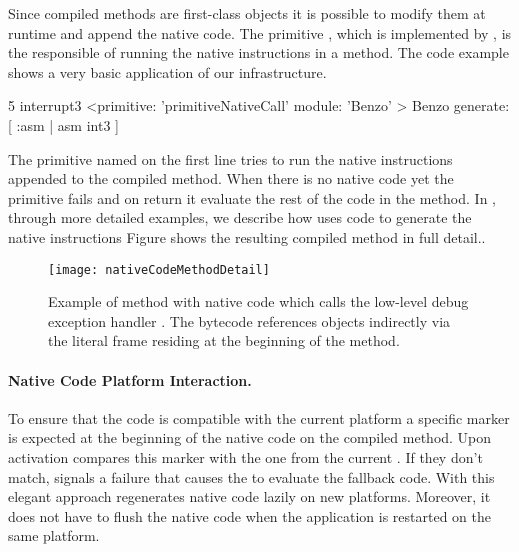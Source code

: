 \noindent Since compiled methods are first-class objects it is possible to modify them at runtime and append the native code.
The primitive , which is implemented by \B, is the responsible of running the native instructions in a \PH method.
The code example  shows a very basic application of our infrastructure.
%
\begin{stcode}[label={lst:benzo-basic-native-code}, caption={\PH method using \B for very basic low-level debugging.}, escapeinside={@}{@}]{5}
interrupt3
	<primitive: 'primitiveNativeCall' 
	 module: 'Benzo' >
	Benzo generate: [ :asm | asm int3 ]
\end{stcode}
%
The primitive named  on the first line tries to run the native instructions appended to the compiled method.
When there is no native code yet the primitive fails and on return it evaluate the rest of the \PH code in the method.
In , through more detailed examples, we describe how \B uses \PH code to generate the native instructions
Figure  shows the resulting compiled method in full detail..
%
\begin{figure}[ht]
    \centering
    \texttt{[image: nativeCodeMethodDetail]}
    \caption[ With \B Code]{Example of \PH method with native code which calls the low-level debug exception handler . The bytecode references objects indirectly via the literal frame residing at the beginning of the method.}
\end{figure}

\paragraph{Native Code Platform Interaction.}

To ensure that the code is compatible with the current platform a \VM specific marker is expected at the beginning of the native code on the compiled method.
Upon activation \B compares this marker with the one from the current \VM.
If they don't match, \B signals a failure that causes the \VM to evaluate the fallback \PH code.
With this elegant approach \B regenerates native code lazily on new platforms.
Moreover, it does not have to flush the native code when the application is restarted on the same platform.

